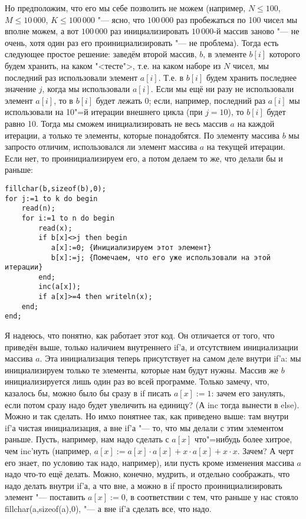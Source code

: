 Но предположим, что его мы себе позволить не можем (например, $N\leq 100$, $M\leq 
10\,000$, $K\leq 100\,000$ "--- ясно, что $100\,000$ раз пробежаться по 100 чисел мы вполне можем, а 
вот $100\,000$ раз инициализировать $10\,000$-й массив заново "--- не очень, хотя один раз его 
проинициализировать "--- не проблема). Тогда есть следующее простое решение: заведём второй массив, 
$b$, в элементе $b[i]$ которого будем хранить, на каком "<тесте">, т.е. на каком наборе из $N$ 
чисел, мы последний раз использовали элемент $a[i]$. Т.е. в $b[i]$ 
будем хранить последнее значение $j$, когда мы использовали $a[i]$. Если мы ещё ни разу не 
использовали элемент $a[i]$, то в $b[i]$ будет лежать 0; если, например, последний раз $a[i]$ мы 
использовали на 10"=й итерации внешнего цикла (при $j=10$), то $b[i]$ будет равно 10. Тогда мы сможем 
инициализировать не весь массив $a$ на каждой итерации, а только те элементы, которые понадобятся. 
По элементу массива $b$ мы запросто отличим, использовался ли элемент массива $a$ на 
текущей итерации. Если нет, то проинициализируем его, а потом делаем то же, что делали бы и раньше:
\begin{codesampleo}\begin{verbatim}
fillchar(b,sizeof(b),0);
for j:=1 to k do begin
    read(n);
    for i:=1 to n do begin
        read(x);
        if b[x]<>j then begin
           a[x]:=0; {Инициализируем этот элемент}
           b[x]:=j; {Помечаем, что его уже использовали на этой итерации}
        end;
        inc(a[x]);
        if a[x]>=4 then writeln(x);
    end;
end;
\end{verbatim}
\end{codesampleo}

Я надеюсь, что понятно, как работает этот код. Он отличается от того, что приведён выше, только 
наличием внутреннего if'а, и отсутствием инициализации массива $a$. Эта инициализация теперь 
присутствует на самом деле внутри if'a: мы инициализируем только те элементы, которые нам будут 
нужны. Массив же $b$ инициализируется лишь один раз во всей программе. Только замечу, что, казалось 
бы, можно было бы сразу в if писать $a[x]:=1$: зачем его занулять, если потом сразу надо будет 
увеличить на единицу? (А inc тогда вынести в else). Можно и так сделать. Но имхо понятнее так, как 
приведено выше: там внутри if'а чистая инициализация, а вне if'а "--- то, что мы делали с этим 
элементом раньше. Пусть, например, нам надо сделать с $a[x]$ что"=нибудь более хитрое, чем 
inc'нуть (например, $a[x]:=a[x]\cdot a[x]+x\cdot a[x]+x\cdot x$. Зачем? А черт его знает, по условию так надо, 
например), или пусть кроме изменения массива $a$ надо что-то ещё делать. Можно, конечно, мудрить, и 
отдельно соображать, что надо делать внутри if'а, а что вне, 
а можно в if просто проинициализировать элемент "--- поставить $a[x]:=0$, в соответствии с тем, что 
раньше у нас стояло fillchar(a,sizeof(a),0), "--- а вне if'а сделать все, что надо.

